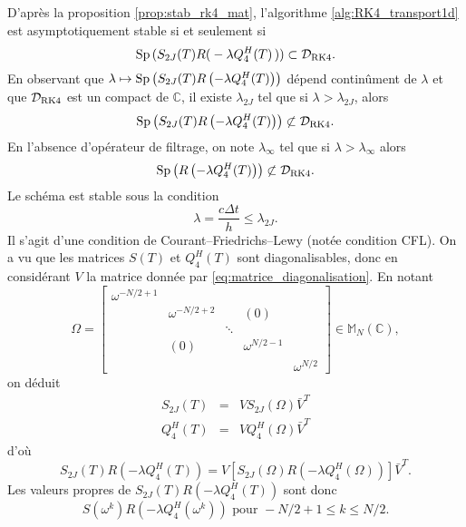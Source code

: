 D'après la proposition \ref{prop:stab_rk4_mat}, l'algorithme \ref{alg:RK4_transport1d} est asymptotiquement stable si et seulement si
\begin{equation}
\Sp \left( S_{2J}(T) R \right( -\lambda Q_{4}^H(T) \left) \right) \subset \mathcal{D}_{\RK4}.
\end{equation}
En observant que $\lambda \mapsto \text{Sp} \left( S_{2J}(T) R \left( -\lambda Q_{4}^H(T) \right) \right)$ dépend continûment de $\lambda$ et que
$\mathcal{D}_{\RK4}$ est un compact de $\mathbb{C}$, il existe $\lambda_{2J}$ tel que si $\lambda > \lambda_{2J}$, alors 
\begin{equation}
\Sp \left( S_{2J}(T) R \left( -\lambda Q_{4}^H(T) \right) \right) \not\subset \mathcal{D}_{\RK4}.
\end{equation}
En l'absence d'opérateur de filtrage, on note $\lambda_{\infty}$ tel que si $\lambda > \lambda_{\infty}$ alors
\begin{equation}
\Sp \left( R \left( -\lambda Q_{4}^H(T) \right) \right) \not\subset \mathcal{D}_{\RK4}.
\end{equation}
Le schéma est stable sous la condition
\begin{equation}
\lambda = \dfrac{c \Delta t}{h} \leq \lambda_{2J}.
\end{equation}
Il s'agit d'une condition de Courant–Friedrichs–Lewy \cite{Courant1928} (notée condition CFL). On a vu que les matrices $S(T)$ et $Q_4^H(T)$ sont diagonalisables, donc en considérant $V$ la matrice donnée par \eqref{eq:matrice_diagonalisation}. En notant
\begin{equation}
\Omega = \begin{bmatrix}
\omega^{-N/2+1} &   &   &   &   \\ 
  & \omega^{-N/2+2} &   & (0) &   \\ 
  &   & \ddots &   &   \\ 
  & (0) &   & \omega^{N/2-1} &   \\ 
  &   &   &   & \omega^{N/2}
\end{bmatrix} \in \mathbb{M}_N(\mathbb{C}),
\end{equation}
on déduit
\begin{equation}
\begin{array}{rcl}
S_{2J}(T) & = & V S_{2J}(\Omega) \bar{V}^T \\
Q_4^H(T) & = & V Q_4^H(\Omega) \bar{V}^T
\end{array}
\end{equation}
d'où
\begin{equation}
S_{2J}(T)R(-\lambda Q_4^H(T)) = V \left[ S_{2J}(\Omega)R(-\lambda Q_4^H(\Omega)) \right] \bar{V}^T.
\end{equation}
Les valeurs propres de $S_{2J}(T)R(-\lambda Q_4^H(T))$ sont donc
\begin{equation}
S(\omega^k)R(-\lambda Q_4^H(\omega^k))  \text{ pour } -N/2+1 \leq k \leq N/2. 
\end{equation}


